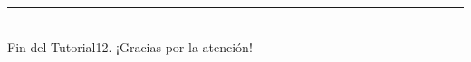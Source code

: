 \documentclass[10pt,a4paper]{article}\usepackage[]{graphicx}\usepackage[]{color}
\newcounter {cont01}
\begin{document}




\vspace{2cm} \hrule
\quad\\
Fin del Tutorial12. ¡Gracias por la atención!

%
\end{document}

